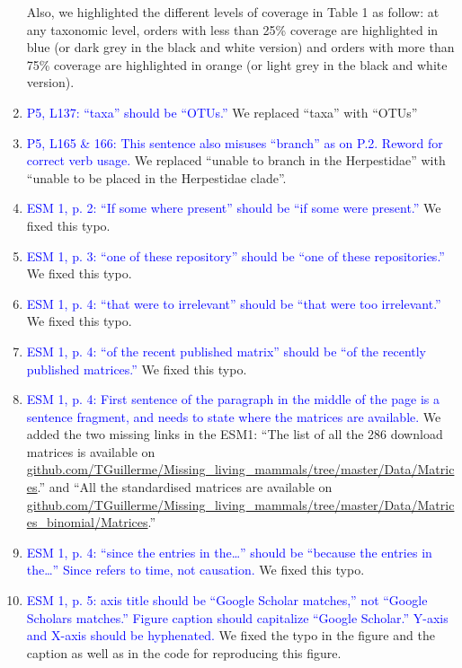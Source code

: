 \documentclass[12pt,letterpaper]{article}
\begin{document}
\begin{enumerate}
Also, we highlighted the different levels of coverage in Table 1 as follow: at any taxonomic level, orders with less than 25\% coverage are highlighted in blue (or dark grey in the black and white version) and orders with more than 75\% coverage are highlighted in orange (or light grey in the black and white version).

\item{\textcolor{blue}{P5, L137: ``taxa'' should be ``OTUs.''}}
We replaced ``taxa'' with ``OTUs''

\item{\textcolor{blue}{P5, L165 \& 166: This sentence also misuses ``branch'' as on P.2. Reword for correct verb usage.}}
We replaced ``unable to branch in the Herpestidae'' with ``unable to be placed in the Herpestidae clade''.

\item{\textcolor{blue}{ESM 1, p. 2: ``If some where present'' should be ``if some were present.''}}
We fixed this typo.

\item{\textcolor{blue}{ESM 1, p. 3: ``one of these repository'' should be ``one of these repositories.''}}
We fixed this typo.

\item{\textcolor{blue}{ESM 1, p. 4: ``that were to irrelevant'' should be ``that were too irrelevant.''}}
We fixed this typo.

\item{\textcolor{blue}{ESM 1, p. 4: ``of the recent published matrix'' should be ``of the recently published matrices.''}}
We fixed this typo.

\item{\textcolor{blue}{ESM 1, p. 4: First sentence of the paragraph in the middle of the page is a sentence fragment, and needs to state where the matrices are available.}}
We added the two missing links in the ESM1: ``The list of all the 286 download matrices is available on \url{github.com/TGuillerme/Missing_living_mammals/tree/master/Data/Matrices}.'' and ``All the standardised matrices are available on \url{github.com/TGuillerme/Missing_living_mammals/tree/master/Data/Matrices_binomial/Matrices}.''

\item{\textcolor{blue}{ESM 1, p. 4: ``since the entries in the…'' should be ``because the entries in the…'' Since refers to time, not causation.}}
We fixed this typo.

\item{\textcolor{blue}{ESM 1, p. 5: axis title should be ``Google Scholar matches,'' not ``Google Scholars matches.'' Figure caption should capitalize ``Google Scholar.'' Y-axis and X-axis should be hyphenated.}}
We fixed the typo in the figure and the caption as well as in the code for reproducing this figure.


\end{enumerate}
\end{document}
